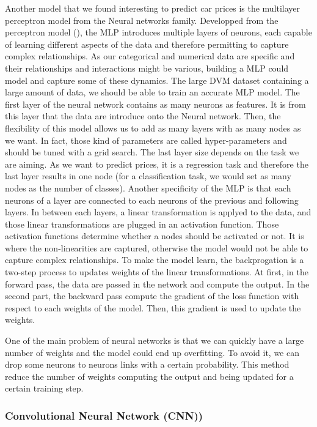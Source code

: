 \documentclass[12pt]{article}
\begin{document}
\noindent Another model that we found interesting to predict car prices is the multilayer perceptron model from the Neural networks family. 
\noindent Developped from the perceptron model (\cite{Rosenblatt1958}), the MLP introduces multiple layers of neurons, each capable of learning different aspects of the data and therefore permitting to capture complex relationships. 
\noindent As our categorical and numerical data are specific and their relationships and interactions might be various, building a MLP could model and capture some of these dynamics. The large DVM dataset containing a large amount of data, we should be able to train an accurate MLP model.
\noindent The first layer of the neural network contains as many neurons as features. It is from this layer that the data are introduce onto the Neural network. Then, the flexibility of this model allows us to add as many layers with as many nodes as we want. In fact, those kind of parameters are called hyper-parameters and should be tuned with a grid search. The last layer size depends on the task we are aiming. As we want to predict prices, it is a regression task and therefore the last layer results in one node (for a classification task, we would set as many nodes as the number of classes). Another specificity of the MLP is that each neurons of a layer are connected to each neurons of the previous and following layers.
In between each layers, a linear transformation is applyed to the data, and those linear transformations are plugged in an activation function. Those activation functions determine whether a nodes should be activated or not. It is where the non-linearities are captured, otherwise the model would not be able to capture complex relationships. To make the model learn, the backprogation is a two-step process to updates weights of the linear transformations. At first, in the forward pass, the data are passed in the network and compute the output. In the second part, the backward pass compute the gradient of the loss function with respect to each weights of the model. Then, this gradient is used to update the weights.

\noindent One of the main problem of neural networks is that we can quickly have a large number of weights and the model could end up overfitting. To avoid it, we can drop some neurons to neurons links with a certain probability. This method reduce the number of weights computing the output and being updated for a certain training step. 


\subsubsection{Convolutional Neural Network (CNN))}
\end{document}
